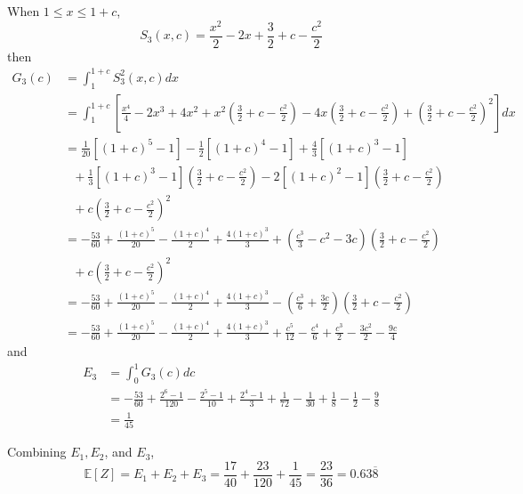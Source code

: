 \documentclass[12pt]{simple_doc}
\begin{document}
    When $1 \leqslant x \leqslant 1 + c$,
    \begin{equation}
        S_3(x, c) = \frac{x^2}{2} - 2x + \frac{3}{2} + c - \frac{c^2}{2}
    \end{equation}
    then
    \begin{equation}
		\begin{aligned}
		G_3(c) &= \int_1^{1+c} S_3^2(x, c) dx \\
		   &= \int_1^{1+c} [\frac{x^4}{4} - 2x^3 + 4x^2 + x^2(\frac{3}{2} + c - \frac{c^2}{2})
              -4x(\frac{3}{2} + c - \frac{c^2}{2}) + (\frac{3}{2} + c - \frac{c^2}{2})^2] dx\\
           &= \frac{1}{20}[(1+c)^5 - 1] - \frac{1}{2}[(1+c)^4 - 1] + \frac{4}{3}[(1+c)^3 - 1]\\
           &\ \ \ + \frac{1}{3}[(1+c)^3 - 1](\frac{3}{2} + c - \frac{c^2}{2})
              - 2[(1+c)^2 - 1](\frac{3}{2} + c - \frac{c^2}{2})\\
           &\ \ \ + c(\frac{3}{2} + c - \frac{c^2}{2})^2\\
           &= -\frac{53}{60} + \frac{(1+c)^5}{20} - \frac{(1+c)^4}{2} + \frac{4(1+c)^3}{3}
              + (\frac{c^3}{3} - c^2 -3c)(\frac{3}{2} + c - \frac{c^2}{2})\\
           &\ \ \ + c(\frac{3}{2} + c - \frac{c^2}{2})^2\\
           &= -\frac{53}{60} + \frac{(1+c)^5}{20} - \frac{(1+c)^4}{2} + \frac{4(1+c)^3}{3}
              - (\frac{c^3}{6} + \frac{3c}{2})(\frac{3}{2} + c - \frac{c^2}{2})\\
           &= -\frac{53}{60} + \frac{(1+c)^5}{20} - \frac{(1+c)^4}{2} + \frac{4(1+c)^3}{3}
              + \frac{c^5}{12} - \frac{c^4}{6} + \frac{c^3}{2} - \frac{3c^2}{2} - \frac{9c}{4}
		\end{aligned}
	\end{equation}
    and
    \begin{equation}
		\begin{aligned}
		E_3 &= \int_0^1 G_3(c) dc \\
		   &= -\frac{53}{60} + \frac{2^6-1}{120} - \frac{2^5-1}{10} + \frac{2^4-1}{3}
                + \frac{1}{72} - \frac{1}{30} + \frac{1}{8} - \frac{1}{2} - \frac{9}{8} \\
           &= \frac{1}{45}
		\end{aligned}
	\end{equation}

    Combining $E_1, E_2$, and $E_3$,
    \begin{equation}
        \mathbb{E}[Z] = E_1 + E_2 + E_3 = \frac{17}{40} + \frac{23}{120} + \frac{1}{45}
                      = \frac{23}{36} = 0.63\overline{8}
    \end{equation}
\end{document}
